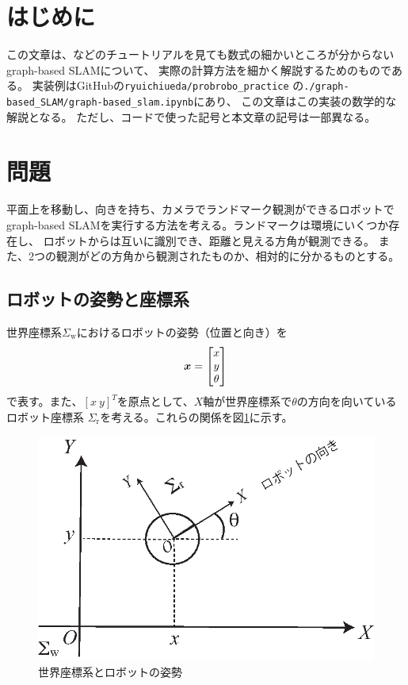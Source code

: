 \section{はじめに}

この文章は、\cite{grisetti2010}などのチュートリアルを見ても数式の細かいところが分からない
graph-based SLAMについて、
実際の計算方法を細かく解説するためのものである。
実装例はGitHubの\texttt{ryuichiueda/probrobo\_practice}
の\texttt{./graph-based\_SLAM/graph-based\_slam.ipynb}にあり、
この文章はこの実装の数学的な解説となる。
ただし、コードで使った記号と本文章の記号は一部異なる。

\section{問題}

平面上を移動し、向きを持ち、カメラでランドマーク観測ができるロボットで
graph-based SLAMを実行する方法を考える。ランドマークは環境にいくつか存在し、
ロボットからは互いに識別でき、距離と見える方角が観測できる。
また、2つの観測がどの方角から観測されたものか、相対的に分かるものとする。

\subsection{ロボットの姿勢と座標系}\label{sub:pose}

世界座標系$\Sigma_\text{w}$におけるロボットの姿勢（位置と向き）を
\begin{align}
	\boldsymbol{x} =
	\begin{bmatrix}
		x \\ y \\ \theta
	\end{bmatrix}
\end{align}
で表す。また、$[x\ y]^T$を原点として、$X$軸が世界座標系で$\theta$の方向を向いているロボット座標系
$\Sigma_\text{r}$を考える。これらの関係を図\ref{fig:coordinate}に示す。

\begin{figure}[htbp]
	\begin{center}
		\includegraphics[width=0.5\linewidth]{./figs/coordinate.eps}
		\caption{世界座標系とロボットの姿勢}
		\label{fig:coordinate}
	\end{center}
\end{figure}

